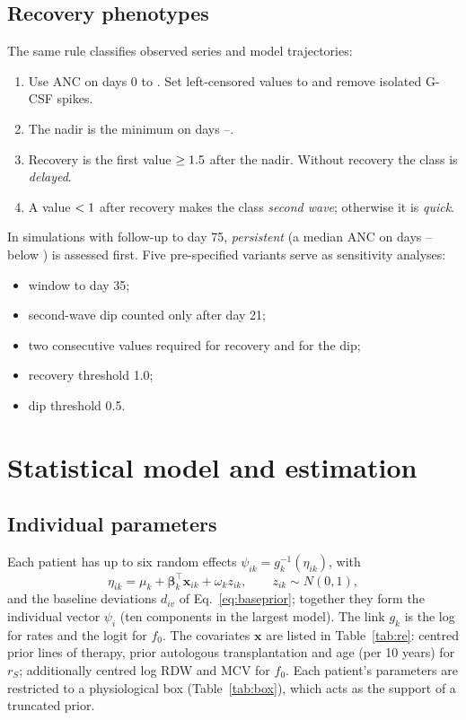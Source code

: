 \documentclass[11pt]{article}
\begin{document}
\subsection{Recovery phenotypes}
The same rule \citep[thresholds of][]{rejeski2021} classifies observed series and model trajectories:
\begin{enumerate}
\item Use ANC on days 0 to \valPhWin. Set left-censored values to \valCensVal{} and remove isolated G-CSF spikes.
\item The nadir is the minimum on days \valNadFrom--\valNadTo.
\item Recovery is the first value $\geq1.5$ after the nadir. Without recovery the class is \emph{delayed}.
\item A value $<1$ after recovery makes the class \emph{second wave}; otherwise it is \emph{quick}.
\end{enumerate}
In simulations with follow-up to day 75, \emph{persistent} (a median ANC on days \valPersFrom--\valPersTo{} below \valPersThr) is assessed first. Five pre-specified variants serve as sensitivity analyses:
\begin{itemize}
\item window to day 35;
\item second-wave dip counted only after day 21;
\item two consecutive values required for recovery and for the dip;
\item recovery threshold 1.0;
\item dip threshold 0.5.
\end{itemize}

\section{Statistical model and estimation}\label{sec:stat}

\subsection{Individual parameters}
Each patient has up to six random effects $\psi_{ik}=g_k^{-1}(\eta_{ik})$, with
\begin{equation}
\eta_{ik} = \mu_k + \boldsymbol\beta_k^\top \mathbf{x}_{ik} + \omega_k z_{ik},\qquad z_{ik}\sim N(0,1),
\end{equation}
and the baseline deviations $d_{iv}$ of Eq.~\ref{eq:baseprior}; together they form the individual vector $\psi_i$ (ten components in the largest model). The link $g_k$ is the log for rates and the logit for $f_0$. The covariates $\mathbf{x}$ are listed in Table~\ref{tab:re}: centred prior lines of therapy, prior autologous transplantation and age (per 10 years) for $r_S$; additionally centred log RDW and MCV for $f_0$. Each patient's parameters are restricted to a physiological box (Table~\ref{tab:box}), which acts as the support of a truncated prior.
\end{document}
